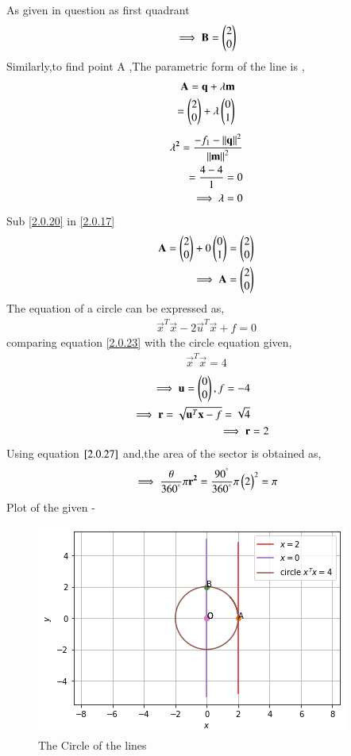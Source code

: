 \documentclass[journal,12pt,twocolumn]{IEEEtran}
\begin{document}
As given in question as first quadrant
\begin{align}
\implies \mathbf{B}=\begin{pmatrix}2\\0\end{pmatrix}   
\end{align}
Similarly,to find point A ,The parametric form of the line is ,
\begin{align}
 \mathbf{A}=\mathbf{q}+\lambda \mathbf{m}\\ =\begin{pmatrix}2\\0\end{pmatrix}+\lambda \begin{pmatrix}0\\1\end{pmatrix} \label{2.0.17}
\end{align}
\begin{align}
 \mathbf{\lambda^2}=\frac{{{-f_1}-\left\lVert\mathbf{q}\right\rVert^2}}{{\left\lVert\mathbf{m}\right\rVert^2}}\\=\frac{{{4}-{4}}}{{{1}}}=0
 \\
\implies \lambda=0 \label{2.0.20}
\end{align}
Sub \eqref{2.0.20} in \eqref{2.0.17}
\begin{align}
 \mathbf{A}=\begin{pmatrix}2 \\0\end{pmatrix}+0\begin{pmatrix}0\\1\end{pmatrix}=\begin{pmatrix}2\\0\end{pmatrix}
 \\
 \implies \mathbf{A}=\begin{pmatrix}2 \\ 0\end{pmatrix}
\end{align}
The equation of a circle can be expressed as,
\begin{align}
\vec{x}^T\vec{x} - 2\vec{u}^T\vec{x} + f= 0\label{2.0.23}
\end{align}
comparing equation \eqref{2.0.23} with the circle equation given,
\begin{align}
\vec{x}^T\vec{x} = 4
\end{align}
\begin{align}
\implies \mathbf{u}=\begin{pmatrix}0\\0\end{pmatrix},f = -4
\\
\implies \mathbf{r}=\sqrt{\mathbf{u}^T\mathbf{x}-{f}}=\sqrt{{4}}
\\
\implies \mathbf{r} &=2 \label{2.0.27}
\end{align}
Using equation $\eqref{2.0.27}$ and,the area of the sector is obtained as,
\begin{align}
 \implies  \frac{\theta}{360^{\degree}}\pi\mathbf{r^2}=\frac{90^{\degree}}{360^{\degree}}\pi\begin{pmatrix}2\end{pmatrix}^2=\pi
\end{align}
Plot of the given -
\begin{figure}[!ht]
\centering
\includegraphics[width=\columnwidth]{Figure 5.png}
\caption{The Circle of the lines }
\label{fig:The circle of the lines}	\end{figure}
\end{document}

